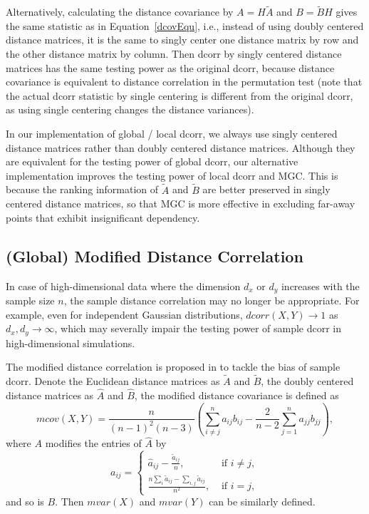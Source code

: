 \documentclass[11pt]{article}
\begin{document}
Alternatively, calculating the distance covariance by $A=H\tilde{A}$ and $B=\tilde{B}H$ gives the same statistic as in Equation~\ref{dcovEqu}, i.e., instead of using doubly centered distance matrices, it is the same to singly center one distance matrix by row and the other distance matrix by column. Then dcorr by singly centered distance matrices has the same testing power as the original dcorr, because distance covariance is equivalent to distance correlation in the permutation test (note that the actual dcorr statistic by single centering is different from the original dcorr, as using single centering changes the distance variances).

In our implementation of global / local dcorr, we always use singly centered distance matrices rather than doubly centered distance matrices. Although they are equivalent for the testing power of global dcorr, our alternative implementation improves the testing power of local dcorr and MGC. This is because the ranking information of $\tilde{A}$ and $\tilde{B}$ are better preserved in singly centered distance matrices, so that MGC is more effective in excluding far-away points that exhibit insignificant dependency.

\subsection{(Global) Modified Distance Correlation}
\label{appen:mcorr}
In case of high-dimensional data where the dimension $d_{x}$ or $d_{y}$ increases with the sample size $n$, the sample distance correlation may no longer be appropriate. For example, even for independent Gaussian distributions, $dcorr(X,Y) \rightarrow 1$ as $d_{x}, d_{y} \rightarrow \infty$, which may severally impair the testing power of sample dcorr in high-dimensional simulations.

The modified distance correlation is proposed in \cite{SzekelyRizzo2013a} to tackle the bias of sample dcorr. Denote the Euclidean distance matrices as $\tilde{A}$ and $\tilde{B}$, the doubly centered distance matrices as $\hat{A}$ and $\hat{B}$, the modified distance covariance is defined as
\begin{equation}
\label{mcovEqu}
mcov(X,Y)=\frac{n}{(n-1)^2(n-3)}(\sum_{i \neq j}^{n}a_{ij}b_{ij}-\frac{2}{n-2}\sum_{j=1}^{n}a_{jj}b_{jj}),
\end{equation}
where $A$ modifies the entries of $\hat{A}$ by
\[a_{ij} = \left\{
  \begin{array}{lr}
    \hat{a}_{ij}-\frac{\tilde{a}_{ij}}{n}, & \mbox{ if } i \neq j, \\
    \frac{n\sum_{i}\tilde{a}_{ij}-\sum_{i,j}\tilde{a}_{ij}}{n^2}, &\mbox{ if } i = j,
  \end{array}
\right.
\]
and so is $B$. Then $mvar(X)$ and $mvar(Y)$ can be similarly defined. 
\end{document}

